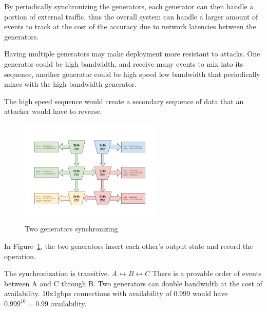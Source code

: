 \documentclass[12pt]{article}
\begin{document}
By periodically synchronizing the generators, each generator can then handle a portion of external traffic, thus the overall system can handle a larger amount of events to track at the cost of the accuracy due to network latencies between the generators.

Having multiple generators may make deployment more resistant to attacks. One generator could be high bandwidth, and receive many events to mix into its sequence, another generator could be high speed low bandwidth that periodically mixes with the high bandwidth generator.

The high speed sequence would create a secondary sequence of data that an attacker would have to reverse.

\begin{figure}
  \begin{center}
    \centering
    \includegraphics[width=0.6\textwidth]{figures/fig_5.png}
    \caption[Fig 5]{Two generators synchronizing\label{fig:poh_scale}}
  \end{center}
  \end{figure}

In Figure~\ref{fig:poh_scale}, the two generators insert each other’s output state and record the operation. 

The synchronization is transitive. \(A \leftrightarrow B \leftrightarrow C\)  There is a provable order of events between A and C through B. Two generators can double bandwidth at the cost of availability. 10x1gbps connections with availability of 0.999 would have \(0.999^{10} = 0.99 \) availability.
\end{document}
